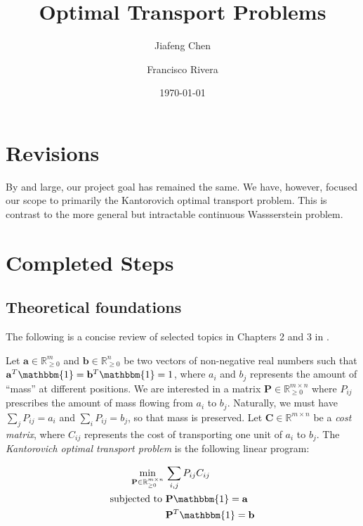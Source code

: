 \documentclass[11pt,reqno]{amsart}
\title{Optimal Transport Problems}
\author{Jiafeng Chen\and Francisco Rivera}
\date{\today}
\renewcommand{\b}{\mathbf}
\newcommand{\R}{\mathbb{R}}
\newcommand{\one}{\mathbbm{1}}
\theoremstyle{definition}
\theoremstyle{remark}
\begin{document}
\maketitle

\tableofcontents

\section{Revisions}

By and large, our project goal has remained the same. We have, however, focused
our scope to primarily the Kantorovich optimal transport problem. This is
contrast to the more general but intractable continuous Wassserstein problem.

\section{Completed Steps}

\subsection{Theoretical foundations}

The following is a concise review of selected topics in Chapters 2 and 3 in
\cite{peyre2017computational}.

Let $\b a \in \R^m_{\ge 0}$ and $\b b \in \R^n_{\ge 0}$ be two vectors of
non-negative real numbers such that $\b a^T \one = \b b^T \one = 1$, where $a_i$
and $b_j$ represents the amount of ``mass'' at different positions. We are
interested in a matrix $\b P \in \R^{m \times n}_{\ge 0}$ where $P_{ij}$
prescribes the amount of mass flowing from $a_i$ to $b_j$. Naturally, we must
have $\sum_j P_{ij} = a_i$ and $\sum_i P_{ij} = b_j$, so that mass is preserved.
Let $\b C \in \R^{m\times n}$ be a \emph{cost matrix}, where $C_{ij}$ represents
the cost of transporting one unit of $a_i$ to $b_j$. The \emph{Kantorovich
optimal transport problem} is the following linear program:

\begin{align*}
\min_{\b P \in \R^{m \times n}_{\ge 0}} \, & \sum_{i,j} P_{ij} C_{ij} \\
\text{subjected to } & \b P \one = \b a \\
& \b P^T \one = \b b
\end{align*}
\end{document}
